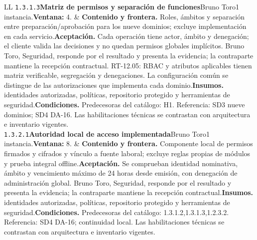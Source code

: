 \begin{longtable}{L{\tabcolsep\relax}L{\tabcolsep\relax}}
\texttt{1.\allowbreak{}3.\allowbreak{}1.\allowbreak{}3}\newline{}\textbf{Matriz de permisos y separación de funciones}\newline{}Bruno Toro\newline{}1 instancia.\newline{}\textbf{Ventana:} 4. & \textbf{Contenido y frontera.} Roles, ámbitos y separación entre preparación/aprobación para los nueve dominios; excluye implementación en cada servicio.\newline{}\textbf{Aceptación.} Cada operación tiene actor, ámbito y denegación; el cliente valida las decisiones y no quedan permisos globales implícitos. Bruno Toro, Seguridad, responde por el resultado y presenta la evidencia; la contraparte mantiene la recepción contractual. RT-12.05: RBAC y atributos aplicables tienen matriz verificable, segregación y denegaciones. La configuración común se distingue de las autorizaciones que implementa cada dominio.\newline{}\textbf{Insumos.} identidades autorizadas, políticas, repositorio protegido y herramientas de seguridad.\newline{}\textbf{Condiciones.} Predecesoras del catálogo: H1. Referencia: SD3 nueve dominios; SD4 DA-16. Las habilitaciones técnicas se contrastan con arquitectura e inventario vigentes.\\\hline
\texttt{1.\allowbreak{}3.\allowbreak{}2.\allowbreak{}1}\newline{}\textbf{Autoridad local de acceso implementada}\newline{}Bruno Toro\newline{}1 instancia.\newline{}\textbf{Ventana:} 8. & \textbf{Contenido y frontera.} Componente local de permisos firmados y cifrados y vínculo a fuente laboral; excluye reglas propias de módulos y prueba integral offline.\newline{}\textbf{Aceptación.} Se comprueban identidad nominativa, ámbito y vencimiento máximo de 24 horas desde emisión, con denegación de administración global. Bruno Toro, Seguridad, responde por el resultado y presenta la evidencia; la contraparte mantiene la recepción contractual.\newline{}\textbf{Insumos.} identidades autorizadas, políticas, repositorio protegido y herramientas de seguridad.\newline{}\textbf{Condiciones.} Predecesoras del catálogo: 1.3.1.2,1.3.1.3,1.2.3.2. Referencia: SD4 DA-16; continuidad local. Las habilitaciones técnicas se contrastan con arquitectura e inventario vigentes.\\\hline

\end{longtable}
